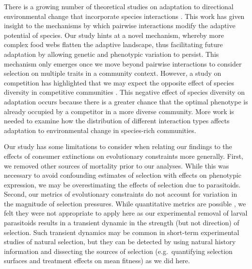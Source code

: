\documentclass[11pt,]{article}
\begin{document}
There is a growing number of theoretical studies on adaptation to
directional environmental change that incorporate species interactions
\citep[e.g.][]{deMazancourt2008, Johansson2008, Norberg2012, Osmond2017PredatorsHelpPrey}.
This work has given insight to the mechanisms by which pairwise
interactions modify the adaptive potential of species. Our study hints
at a novel mechanism, whereby more complex food webs flatten the
adaptive landscape, thus facilitating future adaptation by allowing
genetic and phenotypic variation to persist. This mechanism only emerges
once we move beyond pairwise interactions to consider selection on
multiple traits in a community context. However, a study on competition
has highlighted that we may expect the opposite effect of species
diversity in competitive communities \citep{deMazancourt2008}. This
negative effect of species diversity on adaptation occurs because there
is a greater chance that the optimal phenotype is already occupied by a
competitor in a more diverse community. More work is needed to examine
how the distribution of different interaction types affects adaptation
to environmental change in species-rich communities.

Our study has some limitations to consider when relating our findings to
the effects of consumer extinctions on evolutionary constraints more
generally. First, we removed other sources of mortality prior to our
analyses. While this was necessary to avoid confounding estimates of
selection with effects on phenotypic expression, we may be
overestimating the effects of selection due to parasitoids. Second, our
metrics of evolutionary constraints do not account for variation in the
magnitude of selection pressures. While quantitative metrics are
possible \citep{Hansen2008}, we felt they were not appropriate to apply
here as our experimental removal of larval parasitoids results in a
transient dynamic in the strength (but not direction) of selection. Such
transient dynamics may be common in short-term experimental studies of
natural selection, but they can be detected by using natural history
information and dissecting the sources of selection (e.g.~quantifying
selection surfaces and treatment effects on mean fitness) as we did
here.
\end{document}
